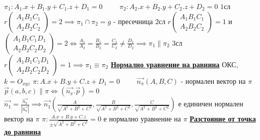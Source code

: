 \documentclass{article}
\begin{document}
$\pi_1 : A_1.x + B_1.y + C_1.z + D_1 = 0 \hspace{1cm} \pi_2 : A_2.x + B_2.y + C_2.z + D_2 = 0$ \newline\newline
$1$сл $r \begin{pmatrix} A_1 B_1 C_1 \\ A_2 B_2 C_2 \end{pmatrix} = 2 \implies \pi_1 \cap \pi_2 = g$ - пресечница \newline\newline
$2$сл $r \begin{pmatrix} A_1 B_1 C_1 \\ A_2 B_2 C_2 \end{pmatrix} = 1$ и $\begin{pmatrix} A_1 B_1 C_1 D_1 \\ A_2 B_2 C_2 D_2
\end{pmatrix} = 2 \iff \frac{A_1}{A_2} = \frac{B_1}{B_2} = \frac{C_1}{C_2} \neq \frac{D_1}{D_2} \implies \pi_1 \parallel \pi_2$ \newline\newline
$3$сл $r \begin{pmatrix} A_1 B_1 C_1 D_1 \\ A_2 B_2 C_2 D_2 \end{pmatrix} = 1 \implies \pi_1 \equiv \pi_2$ \newline\newline
\textbf{\underline{Нормално уравнение на равнина}} \newline\newline
ОКС, $k = O_{xyz}$ \newline
$\pi : A.x + B.y + C.z + D_1 = 0 \hspace{1cm} \vec{n_{\pi}}(A, B, C)$ - нормален вектор на $\pi$ \newline\newline
$\vec{p}(a, b, c) \parallel \pi \iff (\vec{n_{\pi}} . \vec{p}) = 0$ \newline
$\vec{n_1} = \frac{\vec{n_{\pi}}}{|\vec{n_{\pi}}|} \implies \vec{n_1}(\frac{A}{\sqrt{A^2 + B^2 + C^2}}, \frac{B}{\sqrt{A^2 +
B^2 + C^2}}, \frac{C}{\sqrt{A^2 + B^2 + C^2}})$ е единичен нормален вектор на $\pi$ \newline\newline
$\pi : \frac{A.x + B.y + C.z}{\pm\sqrt{A^2 + B^2 + C^2}} = 0$ е нормално уравнение на $\pi$ \newline\newline
\textbf{\underline{Разстояние от точка до равнина}} \newline\newline
\end{document}
